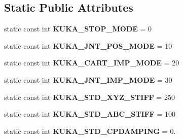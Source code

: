\subsection*{Static Public Attributes}
\begin{DoxyCompactItemize}
\item 
\hypertarget{classkukadu_1_1KukieControlQueue_a8dd833cde832e46a18cff94c5d7b6178}{static const int {\bfseries K\-U\-K\-A\-\_\-\-S\-T\-O\-P\-\_\-\-M\-O\-D\-E} = 0}\label{classkukadu_1_1KukieControlQueue_a8dd833cde832e46a18cff94c5d7b6178}

\item 
\hypertarget{classkukadu_1_1KukieControlQueue_a0be0d5939cfa6de326762e2689f1e0b3}{static const int {\bfseries K\-U\-K\-A\-\_\-\-J\-N\-T\-\_\-\-P\-O\-S\-\_\-\-M\-O\-D\-E} = 10}\label{classkukadu_1_1KukieControlQueue_a0be0d5939cfa6de326762e2689f1e0b3}

\item 
\hypertarget{classkukadu_1_1KukieControlQueue_af6dc1a4a6d11223b8384e3bdfad713e7}{static const int {\bfseries K\-U\-K\-A\-\_\-\-C\-A\-R\-T\-\_\-\-I\-M\-P\-\_\-\-M\-O\-D\-E} = 20}\label{classkukadu_1_1KukieControlQueue_af6dc1a4a6d11223b8384e3bdfad713e7}

\item 
\hypertarget{classkukadu_1_1KukieControlQueue_a821a4327dd8d02a6e5bb914d8fb0a4f2}{static const int {\bfseries K\-U\-K\-A\-\_\-\-J\-N\-T\-\_\-\-I\-M\-P\-\_\-\-M\-O\-D\-E} = 30}\label{classkukadu_1_1KukieControlQueue_a821a4327dd8d02a6e5bb914d8fb0a4f2}

\item 
\hypertarget{classkukadu_1_1KukieControlQueue_a4f36537e3f8d3968cd36460741f83ec3}{static const int {\bfseries K\-U\-K\-A\-\_\-\-S\-T\-D\-\_\-\-X\-Y\-Z\-\_\-\-S\-T\-I\-F\-F} = 250}\label{classkukadu_1_1KukieControlQueue_a4f36537e3f8d3968cd36460741f83ec3}

\item 
\hypertarget{classkukadu_1_1KukieControlQueue_a803666b1c82d70b7b84b05cedd5e4340}{static const int {\bfseries K\-U\-K\-A\-\_\-\-S\-T\-D\-\_\-\-A\-B\-C\-\_\-\-S\-T\-I\-F\-F} = 100}\label{classkukadu_1_1KukieControlQueue_a803666b1c82d70b7b84b05cedd5e4340}

\item 
\hypertarget{classkukadu_1_1KukieControlQueue_a1b73e604f852fe832da9016105a02c7c}{static const int {\bfseries K\-U\-K\-A\-\_\-\-S\-T\-D\-\_\-\-C\-P\-D\-A\-M\-P\-I\-N\-G} = 0.}\label{classkukadu_1_1KukieControlQueue_a1b73e604f852fe832da9016105a02c7c}

\end{DoxyCompactItemize}

